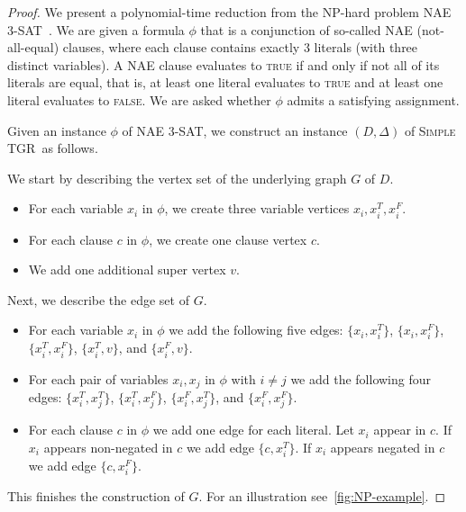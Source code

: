 \documentclass[a4paper,UKenglish,cleveref, autoref, thm-restate]{lipics-v2021}
\newcommand{\deltaExact}{\textsc{Simple TGR}}
\begin{document}
\begin{proof}
	We present a polynomial-time reduction from the NP-hard problem NAE 3-SAT~\cite{Schaefer1978complexity}. We are given a formula $\phi$ that is a conjunction of so-called NAE (not-all-equal) clauses, where each clause contains exactly 3 literals (with three distinct variables).
    A NAE clause evaluates to \textsc{true} if and only if not all of its literals are equal, that is, at least one literal evaluates to \textsc{true} and at least one literal evaluates to \textsc{false}.
    We are asked whether $\phi$ admits a satisfying assignment. 

    
    Given an instance $\phi$ of NAE 3-SAT, we construct an instance $(D,\Delta)$ of \deltaExact\ as follows.

 We start by describing the vertex set of the underlying graph $G$ of $D$.
\begin{itemize}
\item For each variable $x_i$ in $\phi$, we create three variable vertices $x_i, x_i^T, x_i^F$.
\item For each clause $c$ in $\phi$, we create one clause vertex $c$.
\item We add one additional super vertex $v$.
\end{itemize}
Next, we describe the edge set of $G$.
\begin{itemize}
\item For each variable $x_i$ in $\phi$ we add the following five edges: 
$\{x_i, x_i^T\}$, $\{x_i, x_i^F\}$, $\{x_i^T, x_i^F\}$, $\{x_i^T, v\}$, and $\{x_i^F,v\}$.
\item For each pair of variables $x_i,x_j$ in $\phi$ with $i \neq j$ we add the following four edges: 
$\{x_i^T, x_j^T\}$, $\{x_i^T,x_j^F\}$, $\{x_i^F,x_j^T\}$, and $\{x_i^F,x_j^F\}$.
\item For each clause $c$ in $\phi$ we add one edge for each literal. Let $x_i$ appear in $c$. If $x_i$ appears non-negated in $c$ we add edge $\{c, x_i^T\}$. 
If $x_i$ appears negated in $c$ we add edge $\{c, x_i^F\}$.
\end{itemize}
This finishes the construction of $G$.
For an illustration see~\cref{fig:NP-example}.


\end{proof}
\end{document}
